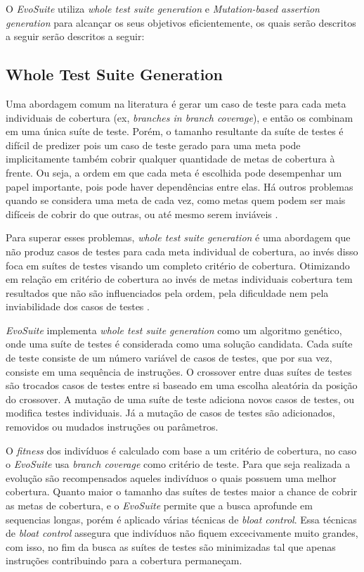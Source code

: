 \documentclass[conference]{IEEEtran}
\begin{document}
O \textit{EvoSuite} utiliza \textit{whole test suite generation} e \textit{Mutation-based assertion generation} para alcançar os seus objetivos eficientemente, os quais serão descritos a seguir serão descritos a seguir:

\subsection{Whole Test Suite Generation}

Uma abordagem comum na literatura é gerar um caso de teste para cada meta individuais de cobertura (ex, \textit{branches in branch coverage}), e então os combinam em uma única suíte de teste. Porém, o tamanho resultante da suíte de testes é difícil de predizer pois um caso de teste gerado para uma meta pode implicitamente também cobrir qualquer quantidade de metas de cobertura à frente. Ou seja, a ordem em que cada meta é escolhida pode desempenhar um papel importante, pois pode haver dependências entre elas. Há outros problemas quando se considera uma meta de cada vez, como metas quem podem ser mais difíceis de cobrir do que outras, ou até mesmo serem inviáveis \cite{fraser2013whole}.

Para superar esses problemas, \textit{whole test suite generation} é uma abordagem que não produz casos de testes para cada meta individual de cobertura, ao invés disso foca em suítes de testes visando um completo critério de cobertura. Otimizando em relação em critério de cobertura ao invés de metas individuais cobertura tem resultados que não são influenciados pela ordem, pela dificuldade nem pela inviabilidade dos casos de testes \cite{fraser2011evosuite}.

\textit{EvoSuite} implementa \textit{whole test suite generation} como um algoritmo genético, onde uma suíte de testes é considerada como uma solução candidata. Cada suíte de teste consiste de um número variável de casos de testes, que por sua vez, consiste em uma sequência de instruções. O crossover entre duas suítes de testes são trocados casos de testes entre si baseado em uma escolha aleatória da posição do crossover. A mutação de uma suíte de teste adiciona novos casos de testes, ou modifica testes individuais. Já a mutação de casos de testes são adicionados, removidos ou mudados instruções ou parâmetros.

O \textit{fitness} dos indivíduos é calculado com base a um critério de cobertura, no caso o \textit{EvoSuite} usa \textit{branch coverage} como critério de teste. Para que seja realizada a evolução são recompensados aqueles indivíduos o quais possuem uma melhor cobertura. Quanto maior o tamanho das suítes de testes maior a chance de cobrir as metas de cobertura, e o \textit{EvoSuite} permite que a busca aprofunde em sequencias longas, porém é aplicado várias técnicas de \textit{bloat control}. Essa técnicas de \textit{bloat control} assegura que indivíduos não fiquem excecivamente muito grandes, com isso, no fim da busca as suítes de testes são minimizadas tal que apenas instruções contribuindo para a cobertura permaneçam.
\end{document}
